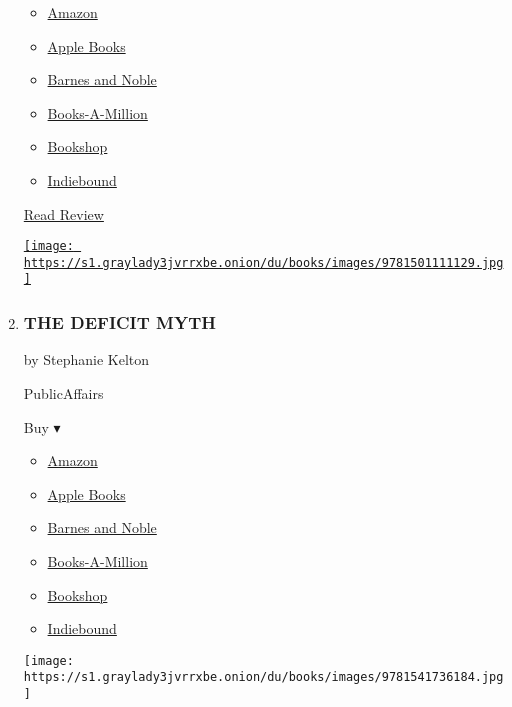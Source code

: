 \begin{enumerate}
  \begin{itemize}
  \tightlist
  \item
    \href{http://www.amazon.com/Grit-The-Power-Passion-Perseverance-ebook/dp/B010MH9V3W?tag=NYTBS-20}{Amazon}
  \item
    \href{https://du-gae-books-dot-nyt-du-prd.appspot.com/buy?title=GRIT\&author=Angela+Duckworth}{Apple
    Books}
  \item
    \href{https://www.anrdoezrs.net/click-7990613-11819508?url=https\%3A\%2F\%2Fwww.barnesandnoble.com\%2Fw\%2F\%3Fean\%3D9781501111112}{Barnes
    and Noble}
  \item
    \href{https://www.anrdoezrs.net/click-7990613-35140?url=https\%3A\%2F\%2Fwww.booksamillion.com\%2Fp\%2FGRIT\%2FAngela\%2BDuckworth\%2F9781501111112}{Books-A-Million}
  \item
    \href{https://bookshop.org/a/3546/9781501111112}{Bookshop}
  \item
    \href{https://www.indiebound.org/book/9781501111112?aff=NYT}{Indiebound}
  \end{itemize}

  \href{https://www.nytimes3xbfgragh.onion/2016/05/08/books/review/grit-by-angela-duckworth.html}{Read
  Review}

  \href{https://www.nytimes3xbfgragh.onion/2016/05/08/books/review/grit-by-angela-duckworth.html}{\texttt{[image: https://s1.graylady3jvrrxbe.onion/du/books/images/9781501111129.jpg]}}
\item
  \hypertarget{the-deficit-myth}{%
  \subsubsection{THE DEFICIT MYTH}\label{the-deficit-myth}}

  by Stephanie Kelton

  PublicAffairs

  Buy ▾

  \begin{itemize}
  \tightlist
  \item
    \href{https://www.amazon.com/dp/1541736184?tag=NYTBSREV-20\&tag=NYTBS-20}{Amazon}
  \item
    \href{https://du-gae-books-dot-nyt-du-prd.appspot.com/buy?title=THE+DEFICIT+MYTH\&author=Stephanie+Kelton}{Apple
    Books}
  \item
    \href{https://www.anrdoezrs.net/click-7990613-11819508?url=https\%3A\%2F\%2Fwww.barnesandnoble.com\%2Fw\%2F\%3Fean\%3D9781541736184}{Barnes
    and Noble}
  \item
    \href{https://www.anrdoezrs.net/click-7990613-35140?url=https\%3A\%2F\%2Fwww.booksamillion.com\%2Fp\%2FTHE\%2BDEFICIT\%2BMYTH\%2FStephanie\%2BKelton\%2F9781541736184}{Books-A-Million}
  \item
    \href{https://bookshop.org/a/3546/9781541736184}{Bookshop}
  \item
    \href{https://www.indiebound.org/book/9781541736184?aff=NYT}{Indiebound}
  \end{itemize}

  \texttt{[image: https://s1.graylady3jvrrxbe.onion/du/books/images/9781541736184.jpg]}
\end{enumerate}

